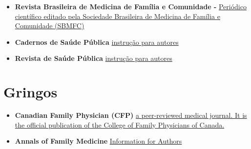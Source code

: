 \documentclass[]{book}
\begin{document}
\begin{itemize}
\item
  \textbf{Revista Brasileira de Medicina de Família e Comunidade - } \href{https://www.rbmfc.org.br/rbmfc/about/submissions}{Periódico científico editado pela Sociedade Brasileira de Medicina de Família e Comunidade (SBMFC)}
\item
  \textbf{Cadernos de Saúde Pública} \href{http://cadernos.ensp.fiocruz.br/csp/submissao/instrucao-para-autores}{instrução para autores}
\item
  \textbf{Revista de Saúde Pública} \href{http://www.rsp.fsp.usp.br/instrucoes-aos-autores/\#artigos-originais}{instrução para autores}
\end{itemize}

\hypertarget{gringos}{%
\section*{Gringos}\label{gringos}}

\begin{itemize}
\item
  \textbf{Canadian Family Physician (CFP)} \href{https://www.cfp.ca/content/authors-reviewers}{a peer-reviewed medical journal. It is the official publication of the College of Family Physicians of Canada.}
\item
  \textbf{Annals of Family Medicine} \href{http://www.annfammed.org/}{Information for Authors}
\end{itemize}


\end{document}
